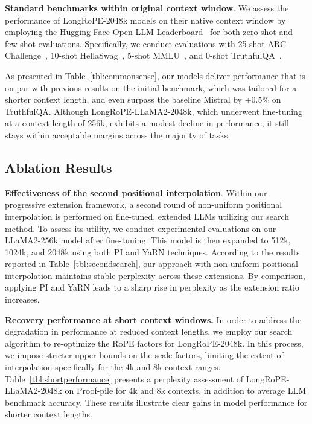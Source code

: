 \textbf{Standard benchmarks within original context window}. We assess the performance of LongRoPE-2048k models on their native context window by employing the Hugging Face Open LLM Leaderboard~\cite{huggingfaceboard} for both zero-shot and few-shot evaluations. Specifically, we conduct evaluations with 25-shot ARC-Challenge~\cite{allenai:arc}, 10-shot HellaSwag~\cite{zellers2019hellaswag}, 5-shot MMLU~\cite{mmlu}, and 0-shot TruthfulQA~\cite{lin2021truthfulqa}.

As presented in Table~\ref{tbl:commonsense}, our models deliver performance that is on par with previous results on the initial benchmark, which was tailored for a shorter context length, and even surpass the baseline Mistral by +0.5\% on TruthfulQA. Although LongRoPE-LLaMA2-2048k, which underwent fine-tuning at a context length of 256k, exhibits a modest decline in performance, it still stays within acceptable margins across the majority of tasks.

\subsection{Ablation Results}

\textbf{Effectiveness of the second positional interpolation}. Within our progressive extension framework, a second round of non-uniform positional interpolation is performed on fine-tuned, extended LLMs utilizing our search method. To assess its utility, we conduct experimental evaluations on our LLaMA2-256k model after fine-tuning. This model is then expanded to 512k, 1024k, and 2048k using both PI and YaRN techniques. According to the results reported in Table~\ref{tbl:secondsearch}, our approach with non-uniform positional interpolation maintains stable perplexity across these extensions. By comparison, applying PI and YaRN leads to a sharp rise in perplexity as the extension ratio increases.

\textbf{Recovery performance at short context windows.} In order to address the degradation in performance at reduced context lengths, we employ our search algorithm to re-optimize the RoPE factors for LongRoPE-2048k. In this process, we impose stricter upper bounds on the scale factors, limiting the extent of interpolation specifically for the 4k and 8k context ranges. Table~\ref{tbl:shortperformance} presents a perplexity assessment of LongRoPE-LLaMA2-2048k on Proof-pile for 4k and 8k contexts, in addition to average LLM benchmark accuracy. These results illustrate clear gains in model performance for shorter context lengths.

